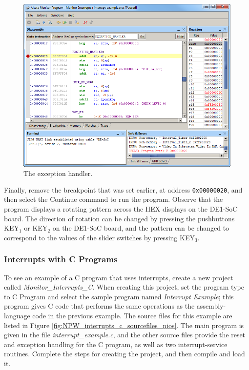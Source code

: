 \documentclass[11pt, twoside, pdftex]{article}
\begin{document}
\begin{figure}[H]
   \begin{center}
      \includegraphics[scale=0.6]{screenshots/figure52.png}
   \end{center}
   \caption{The exception handler.} 
   \label{fig:AMP_interrupts_exceptionhandler_nios}
\end{figure}

Finally, remove the breakpoint that was set earlier, at address
\texttt{0x00000020}, and then select the \textsf{Continue}
command to run the program. Observe that the program displays a
rotating pattern across the HEX displays on the DE1-SoC board.
The direction of rotation can be changed by pressing the
pushbuttons KEY$_1$ or KEY$_2$ on the DE1-SoC board, and the
pattern can be changed to correspond to the
values of the slider switches by pressing KEY$_3$.  

\subsubsection{Interrupts with C Programs}

To see an example of a C program that uses interrupts, create a
new project called {\it Monitor\_Interrupts\_C}.
When creating this project, set the program type to 
{\sf C Program} and select the sample program named 
{\it Interrupt Example}; this program gives C code that performs
the same operations as the assembly-language code in the previous
example. The source files for this example are listed in 
Figure \ref{fig:NPW_interrupts_c_sourcefiles_nios}. The main program is given in the file 
{\it interrupt\_example.c}, and the other source files provide
the reset and exception handling for the C program, as well as
two interrupt-service routines.  Complete the steps for creating
the project, and then compile and load it.
\end{document}
